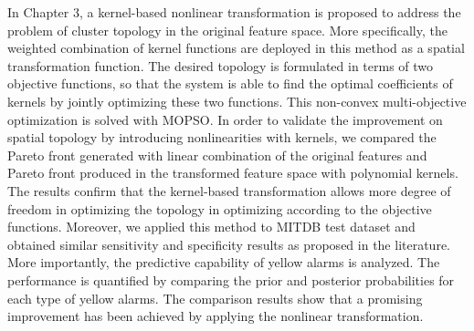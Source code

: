 In Chapter 3, a kernel-based nonlinear transformation is proposed to address the problem of cluster topology in the original feature space. More specifically, the weighted combination of kernel functions are deployed in this method as a spatial transformation function. The desired topology is formulated in terms of two objective functions, so that the system is able to find the optimal coefficients of kernels by jointly optimizing these two functions. This non-convex multi-objective optimization is solved with MOPSO. In order to validate the improvement on spatial topology by introducing nonlinearities with kernels, we compared the Pareto front generated with linear combination of the original features and Pareto front produced in the transformed feature space with polynomial kernels. The results confirm that the kernel-based transformation allows more degree of freedom in optimizing the topology in optimizing according to the objective functions. Moreover, we applied this method to MITDB test dataset and obtained similar sensitivity and specificity results as proposed in the literature. More importantly, the predictive capability of yellow alarms is analyzed. The performance is quantified by comparing the prior and posterior probabilities for each type of yellow alarms. The comparison results show that a promising improvement has been achieved by applying the nonlinear transformation. 

